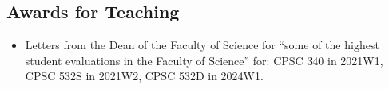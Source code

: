 \documentclass[10pt]{article}
\begin{document}
\nasubsection{
\subsection{Consultant} %
}



\subsection{Awards for Teaching} %

\begin{itemize}[leftmargin=5em]
    \item[] Letters from the Dean of the Faculty of Science for ``some of the highest student evaluations in the Faculty of Science'' for: CPSC 340 in 2021W1, CPSC 532S in 2021W2, CPSC 532D in 2024W1.
\end{itemize}
\end{document}
